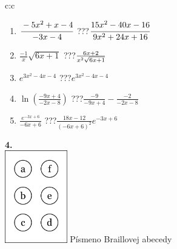 \documentclass[10pt]{report}
\begin{document}
\begin{tabular}{c:c}
\begin{minipage}[c][104.5mm][t]{0.5\linewidth}
\begin{center}
\begin{minipage}{0.79\linewidth}
\begin{center}
\begin{varwidth}{\linewidth}
\begin{enumerate}
\item $\cfrac{-5x^2+x-4}{-3x-4}$\quad \dotfill\; ???\;\dotfill \quad $\cfrac{15x^2-40x-16}{9x^2+24x+16}$
\item $\frac{-1}{x}\sqrt{6x+1}$\quad \dotfill\; ???\;\dotfill \quad $\frac{6x+2}{x^2 \sqrt{\smash[b]{6x+1}}}$
\item $e^{3x^2-4x-4}$\quad \dotfill\; ???\;\dotfill \quad $e^{3x^2-4x-4}$
\item $\ln{\left(\frac{-9x+4}{-2x-8}\right)}$\quad \dotfill\; ???\;\dotfill \quad $\frac{-9}{-9x+4}-\frac{-2}{-2x-8}$
\item $\frac{e^{-3x+6}}{-6x+6}$\quad \dotfill\; ???\;\dotfill \quad $\frac{18x-12}{(-6x+6)^2}e^{-3x+6}$
\end{enumerate}
\end{varwidth}
\end{center}
\end{minipage}
\begin{minipage}{0.20\linewidth}
\begin{center}
{\Huge\bfseries 4.} \\[2mm]
\includegraphics[height=40mm]{../images/braille.png}
{\small Písmeno Braillovej abecedy}
\end{center}
\end{minipage}
\end{center}
\end{minipage}
%
\end{tabular}
\newpage
\thispagestyle{empty}
\end{document}
